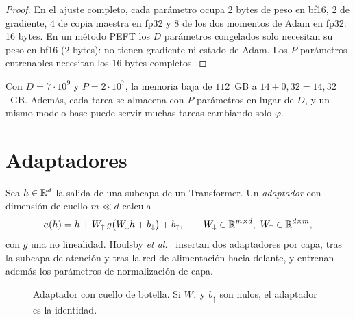 \begin{proof}
En el ajuste completo, cada parámetro ocupa 2 bytes de peso en bf16, 2 de gradiente, 4 de copia maestra en fp32 y 8 de los dos momentos de Adam en fp32: 16 bytes. En un método PEFT los $D$ parámetros congelados solo necesitan su peso en bf16 (2 bytes): no tienen gradiente ni estado de Adam. Los $P$ parámetros entrenables necesitan los 16 bytes completos.
\end{proof}

Con $D=7\cdot 10^{9}$ y $P=2\cdot 10^{7}$, la memoria baja de $112$~GB a $14+0{,}32=14{,}32$~GB. Además, cada tarea se almacena con $P$ parámetros en lugar de $D$, y un mismo modelo base puede servir muchas tareas cambiando solo $\varphi$.

\section{Adaptadores}

\begin{definicion}[Adaptador]\label{def:adaptador}
Sea $h\in\mathbb{R}^{d}$ la salida de una subcapa de un Transformer. Un \emph{adaptador} con dimensión de cuello $m\ll d$ calcula
\[
a(h)=h+W_{\uparrow}\,g\bigl(W_{\downarrow}h+b_{\downarrow}\bigr)+b_{\uparrow},\qquad W_{\downarrow}\in\mathbb{R}^{m\times d},\ W_{\uparrow}\in\mathbb{R}^{d\times m},
\]
con $g$ una no linealidad. Houlsby \emph{et al.}~\cite{houlsby} insertan dos adaptadores por capa, tras la subcapa de atención y tras la red de alimentación hacia delante, y entrenan además los parámetros de normalización de capa.
\end{definicion}

\begin{figure}[h]
\centering
{}
\caption{Adaptador con cuello de botella. Si $W_{\uparrow}$ y $b_{\uparrow}$ son nulos, el adaptador es la identidad.}
\label{fig:adaptador}
\end{figure}

